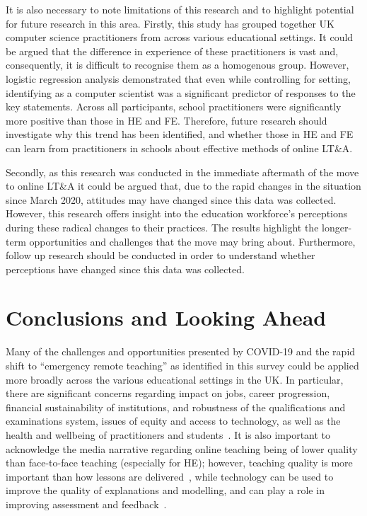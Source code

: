 \documentclass[sigconf]{acmart}
\begin{document}
It is also necessary to note limitations of this research and to
highlight potential for future research in this area. Firstly, this
study has grouped together UK computer science practitioners from
across various educational settings. It could be argued that the
difference in experience of these practitioners is vast and,
consequently, it is difficult to recognise them as a homogenous
group. However, logistic regression analysis demonstrated that even
while controlling for setting, identifying as a computer scientist was
a significant predictor of responses to the key statements. Across all
participants, school practitioners were significantly more positive
than those in HE and FE. Therefore, future research should investigate
why this trend has been identified, and whether those in HE and FE can
learn from practitioners in schools about effective methods of online
LT\&A.

Secondly, as this research was conducted in the immediate aftermath of
the move to online LT\&A it could be argued that, due to the rapid
changes in the situation since March 2020, attitudes may have changed
since this data was collected. However, this research offers insight
into the education workforce’s perceptions during these radical
changes to their practices. The results highlight the longer-term
opportunities and challenges that the move may bring
about. Furthermore, follow up research should be conducted in order to
understand whether perceptions have changed since this data was
collected.

\section{Conclusions and Looking Ahead}\label{conclusions}

Many of the challenges and opportunities presented by COVID-19 and the
rapid shift to ``emergency remote teaching'' as identified in this
survey could be applied more broadly across the various educational
settings in the UK. In particular, there are significant concerns
regarding impact on jobs, career progression, financial sustainability
of institutions, and robustness of the qualifications and examinations
system, issues of equity and access to technology, as well as the
health and wellbeing of practitioners and
students~\cite{watermeyer-et-al:he2020}. It is also important to
acknowledge the media narrative regarding online teaching being of
lower quality than face-to-face teaching (especially for HE); however,
teaching quality is more important than how lessons are
delivered~\cite{eefremote:2020}, while technology can be used to
improve the quality of explanations and modelling, and can play a role
in improving assessment and feedback~\cite{eefdigtech:2019}.
\end{document}
